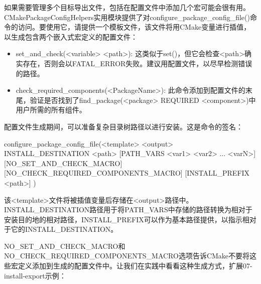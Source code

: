 如果需要管理多个目标导出文件，包括在配置文件中添加几个宏可能会很有用。CMakePackageConfigHelpers实用模块提供了对configure\_package\_config\_file()命令的访问。要使用它，请提供一个模板文件，该文件将用CMake变量进行插值，以生成包含两个嵌入式宏定义的配置文件：

\begin{itemize}
\item
set\_and\_check(<variable> <path>): 这类似于set()，但它会检查<path>确实存在，否则会以FATAL\_ERROR失败。建议用配置文件，以尽早检测错误的路径。

\item
check\_required\_components(<PackageName>): 此命令添加到配置文件的末尾，验证是否找到了find\_package(<package> REQUIRED <component>)中用户所需的所有组件。
\end{itemize}

配置文件生成期间，可以准备复杂目录树路径以进行安装。这是命令的签名：

\begin{shell}
configure_package_config_file(<template> <output>
    INSTALL_DESTINATION <path>
    [PATH_VARS <var1> <var2> ... <varN>]
    [NO_SET_AND_CHECK_MACRO]
    [NO_CHECK_REQUIRED_COMPONENTS_MACRO]
    [INSTALL_PREFIX <path>]
)
\end{shell}

该<template>文件将被插值变量后存储在<output>路径中。INSTALL\_DESTINATION路径用于将PATH\_VARS中存储的路径转换为相对于安装目的地的相对路径，INSTALL\_PREFIX可以作为基本路径提供，以指示相对于它的INSTALL\_DESTINATION。

NO\_SET\_AND\_CHECK\_MACRO和NO\_CHECK\_REQUIRED\_COMPONENTS\_MACRO选项告诉CMake不要将这些宏定义添加到生成的配置文件中。让我们在实践中看看这种生成方式，扩展07-install-export示例：



